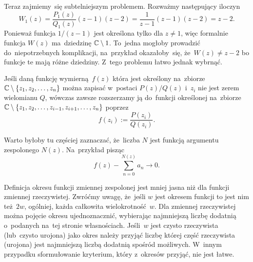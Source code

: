 \documentclass[a4paper,11pt]{article}
\begin{document}
Teraz zajmiemy~się subtelniejszym problemem. Rozważmy następujący
iloczyn
\begin{equation}
  \label{eq:Leja-35}
  W_{ 1 }( z ) =
  \frac{ P_{ 1 }( z ) }{ Q_{ 1 }( z ) } ( z - 1 ) ( z - 2 )
  = \frac{ 1 }{ z - 1 } ( z - 1 ) ( z - 2 ) = z - 2.
\end{equation}
Ponieważ funkcja $1 / ( z - 1 )$ jest określona tylko dla $z \neq 1$,
więc formalnie funkcja $W( z )$ ma~dziedzinę $\mathbb{C} \setminus 1$.
To~jedna mogłoby prowadzić do~niepotrzebnych komplikacji, na~przykład
okazałoby~się, że~$W( z ) \neq z - 2$ bo funkcje te mają różne
dziedziny. Z~tego problemu łatwo jednak wybrnąć.

Jeśli daną funkcję wymierną~$f( z )$ która jest określony na~zbiorze
$\mathbb{C} \setminus \{ z_{ 1 }, z_{ 2 }, \ldots, z_{ n } \}$ można zapisać
w~postaci $P( z ) / Q( z )$ i~$z_{ i }$ nie jest zerem wielomianu $Q$,
wówczas zawsze rozszerzamy ją do~funkcji określonej na~zbiorze
$\mathbb{C} \setminus \{ z_{ 1 }, z_{ 2 }, \ldots, z_{ i - 1 }, z_{ i + 1 }, \ldots, z_{ n } \}$ poprzez
\begin{equation}
  \label{eq:Leja-36}
    f( z_{ i } ) := \frac{ P( z_{ i } ) }{ Q( z_{ i } ) }.
\end{equation}

\vspace{\spaceFour}



\start {} Warto byłoby tu częściej zaznaczać, że~liczba $N$ jest
funkcją argumentu zespolonego $N( z )$. Na~przykład pisząc
\begin{equation}
  \label{eq:Leja-37}
  f( z ) - \sum_{ n = 0 }^{ N( z ) } a_{ n } \to 0.
\end{equation}

\vspace{\spaceFour}



\start {} Definicja okresu funkcji zmiennej zespolonej jest
mniej jasna niż dla funkcji zmiennej rzeczywistej. Zwróćmy uwagę,
że~jeśli $w$ jest okresem funkcji to jest nim też~$2w$, ogólniej,
każda całkowita wielokrotność~$w$. Dla zmiennej rzeczywistej można
pojęcie okresu ujednoznacznić, wybierając najmniejszą liczbę dodatnią
o~podanych na~tej stronie własnościach. Jeśli~$w$ jest czysto
rzeczywista (lub~czysto urojona) jako okres należy przyjąć liczbę
której część rzeczywista (urojona) jest najmniejszą liczbą dodatnią
spośród możliwych. W~innym przypadku sformułowanie kryterium, który
z~okresów przyjąć, nie jest łatwe.
\end{document}
